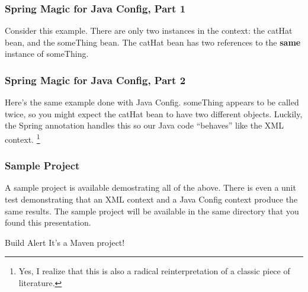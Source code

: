 \documentclass[t,handout]{beamer}
\begin{document}
        \frame
        {
            \frametitle{Spring Magic for Java Config, Part 1}
            Consider this example.  There are only two instances in the context:
            the catHat bean, and the someThing bean.  The catHat bean has two
            references to the \textbf{same} instance of someThing.
            {\tiny
                
            }
        }

        \frame
        {
            \frametitle{Spring Magic for Java Config, Part 2}
            Here's the same example done with Java Config.  someThing appears
            to be called twice, so you might expect the catHat bean to have
            two different objects.  Luckily, the Spring annotation handles this
            so our Java code ``behaves'' like the XML context.
            \footnote[frame]{\tiny{Yes, I realize that this is also a radical
            reinterpretation of a classic piece of literature.}}

            {\tiny
                
            }
        }

        \frame
        {
            \frametitle{Sample Project}

            A sample project is available demostrating all of the above.  There
            is even a unit test demonstrating that an XML context and a Java
            Config context produce the same results.  The sample project will
            be available in the same directory that you found this presentation.

            \begin{alertblock}{Build Alert}
                It's a Maven project!
            \end{alertblock}
        }
\end{document}
